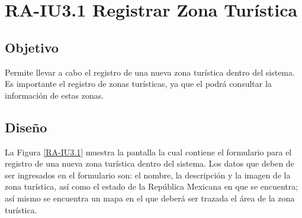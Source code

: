 \newpage
\section{RA-IU3.1 Registrar Zona Turística}

\subsection{Objetivo}
Permite llevar a cabo el registro de una nueva zona turística dentro del sistema. Es importante el registro de zonas turísticas, ya que el  podrá consultar la información de estas zonas.

\subsection{Diseño}
La Figura \ref{RA-IU3.1} muestra la pantalla  la cual contiene el formulario para el registro de una nueva zona turística dentro del sistema. Los datos que deben de ser ingresados en el formulario son: el nombre, la descripción y la imagen de la zona turística, así como el estado de la República Mexicana en que se encuentra; así mismo se encuentra un mapa en el que deberá ser trazada el área de la zona turística.

